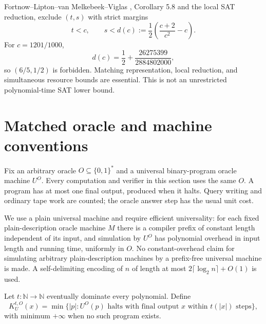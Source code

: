 \documentclass[11pt]{article}
\begin{document}
Fortnow--Lipton--van Melkebeek--Viglas \cite{flmv2004}, Corollary 5.8
and the local SAT reduction, exclude $(t,s)$ with strict margins
\[
 t<c,\qquad
 s<d(c):=\frac12\left(\frac{c+2}{c^2}-c\right).
\]
For $c=1201/1000$,
\[
 d(c)=\frac12+\frac{26275399}{2884802000},
\]
so $(6/5,1/2)$ is forbidden. Matching representation, local reduction,
and simultaneous resource bounds are essential. This is not an
unrestricted polynomial-time SAT lower bound.

\section{Matched oracle and machine conventions}
Fix an arbitrary oracle $O\subseteq\{0,1\}^{*}$ and a universal binary-program
oracle machine $U^O$. Every computation and verifier in this section uses
the same $O$. A program has at most one final output, produced when it
halts. Query writing and ordinary tape work are counted; the oracle
answer step has the usual unit cost.

We use a plain universal machine and require efficient universality:
for each fixed plain-description oracle machine $M$
there is a compiler prefix of constant length independent of its input,
and simulation by $U^O$ has polynomial overhead in input length and
running time, uniformly in $O$. No constant-overhead claim for simulating
arbitrary plain-description machines by a prefix-free universal machine
is made. A self-delimiting encoding of
$n$ of length at most $2\lceil\log_2n\rceil+O(1)$ is used.

Let $t:\mathbb N\to\mathbb N$ eventually dominate every polynomial.
Define
\[
 K_U^{t,O}(x)=\min\{|p|:U^O(p)\text{ halts with final output }x
                   \text{ within }t(|x|)\text{ steps}\},
\]
with minimum $+\infty$ when no such program exists.
\end{document}
